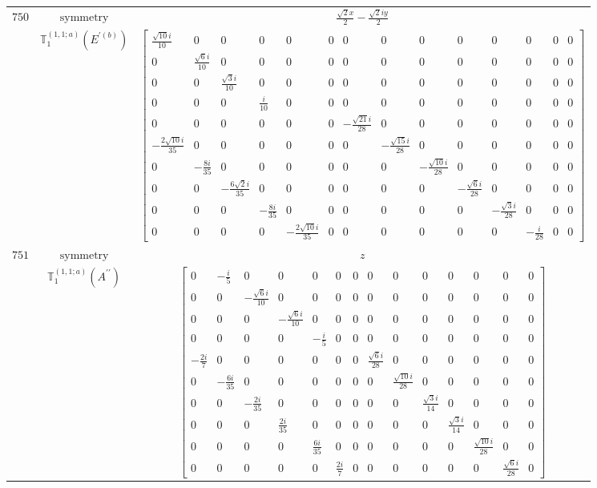 \documentclass[fleqn,8pt,landscape]{jsarticle}
\begin{document}
\begin{longtable}{ccc}
$ 750 $ & $ \text{symmetry} $ & $ \frac{\sqrt{2} x}{2} - \frac{\sqrt{2} i y}{2} $ \\
$  $ & $ \mathbb{T}_{1}^{(1,1;a)}(E^{\prime(b)}) $ & $ \begin{bmatrix} \frac{\sqrt{10} i}{10} & 0 & 0 & 0 & 0 & 0 & 0 & 0 & 0 & 0 & 0 & 0 & 0 & 0 \\ 0 & \frac{\sqrt{6} i}{10} & 0 & 0 & 0 & 0 & 0 & 0 & 0 & 0 & 0 & 0 & 0 & 0 \\ 0 & 0 & \frac{\sqrt{3} i}{10} & 0 & 0 & 0 & 0 & 0 & 0 & 0 & 0 & 0 & 0 & 0 \\ 0 & 0 & 0 & \frac{i}{10} & 0 & 0 & 0 & 0 & 0 & 0 & 0 & 0 & 0 & 0 \\ 0 & 0 & 0 & 0 & 0 & 0 & - \frac{\sqrt{21} i}{28} & 0 & 0 & 0 & 0 & 0 & 0 & 0 \\ - \frac{2 \sqrt{10} i}{35} & 0 & 0 & 0 & 0 & 0 & 0 & - \frac{\sqrt{15} i}{28} & 0 & 0 & 0 & 0 & 0 & 0 \\ 0 & - \frac{8 i}{35} & 0 & 0 & 0 & 0 & 0 & 0 & - \frac{\sqrt{10} i}{28} & 0 & 0 & 0 & 0 & 0 \\ 0 & 0 & - \frac{6 \sqrt{2} i}{35} & 0 & 0 & 0 & 0 & 0 & 0 & - \frac{\sqrt{6} i}{28} & 0 & 0 & 0 & 0 \\ 0 & 0 & 0 & - \frac{8 i}{35} & 0 & 0 & 0 & 0 & 0 & 0 & - \frac{\sqrt{3} i}{28} & 0 & 0 & 0 \\ 0 & 0 & 0 & 0 & - \frac{2 \sqrt{10} i}{35} & 0 & 0 & 0 & 0 & 0 & 0 & - \frac{i}{28} & 0 & 0 \end{bmatrix} $ \\ \hline
$ 751 $ & $ \text{symmetry} $ & $ z $ \\
$  $ & $ \mathbb{T}_{1}^{(1,1;a)}(A^{\prime\prime}) $ & $ \begin{bmatrix} 0 & - \frac{i}{5} & 0 & 0 & 0 & 0 & 0 & 0 & 0 & 0 & 0 & 0 & 0 & 0 \\ 0 & 0 & - \frac{\sqrt{6} i}{10} & 0 & 0 & 0 & 0 & 0 & 0 & 0 & 0 & 0 & 0 & 0 \\ 0 & 0 & 0 & - \frac{\sqrt{6} i}{10} & 0 & 0 & 0 & 0 & 0 & 0 & 0 & 0 & 0 & 0 \\ 0 & 0 & 0 & 0 & - \frac{i}{5} & 0 & 0 & 0 & 0 & 0 & 0 & 0 & 0 & 0 \\ - \frac{2 i}{7} & 0 & 0 & 0 & 0 & 0 & 0 & \frac{\sqrt{6} i}{28} & 0 & 0 & 0 & 0 & 0 & 0 \\ 0 & - \frac{6 i}{35} & 0 & 0 & 0 & 0 & 0 & 0 & \frac{\sqrt{10} i}{28} & 0 & 0 & 0 & 0 & 0 \\ 0 & 0 & - \frac{2 i}{35} & 0 & 0 & 0 & 0 & 0 & 0 & \frac{\sqrt{3} i}{14} & 0 & 0 & 0 & 0 \\ 0 & 0 & 0 & \frac{2 i}{35} & 0 & 0 & 0 & 0 & 0 & 0 & \frac{\sqrt{3} i}{14} & 0 & 0 & 0 \\ 0 & 0 & 0 & 0 & \frac{6 i}{35} & 0 & 0 & 0 & 0 & 0 & 0 & \frac{\sqrt{10} i}{28} & 0 & 0 \\ 0 & 0 & 0 & 0 & 0 & \frac{2 i}{7} & 0 & 0 & 0 & 0 & 0 & 0 & \frac{\sqrt{6} i}{28} & 0 \end{bmatrix} $ \\ \hline

\end{longtable}
\end{document}
